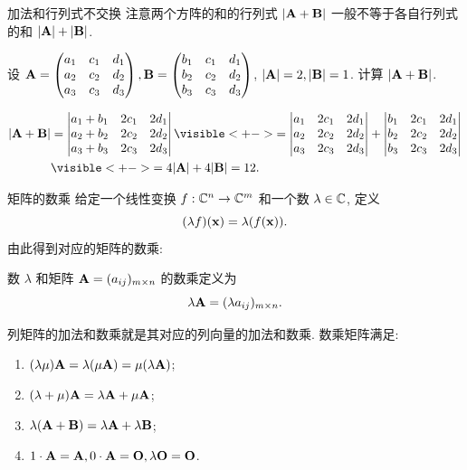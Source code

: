 \begin{frame}{加法和行列式不交换}
	\onslide<+->
	注意两个方阵的和的行列式 $|{\mathbf{A}}+{\mathbf{B}}|$ 一般\alert{不等于}各自行列式的和 $|{\mathbf{A}}|+|{\mathbf{B}}|$.
	\onslide<+->
	\begin{example}
		设 ${\mathbf{A}}=\begin{pmatrix}
			a_1&c_1&d_1\\
			a_2&c_2&d_2\\
			a_3&c_3&d_3
		\end{pmatrix},{\mathbf{B}}=\begin{pmatrix}
			b_1&c_1&d_1\\
			b_2&c_2&d_2\\
			b_3&c_3&d_3
		\end{pmatrix}$, $|{\mathbf{A}}|=2,|{\mathbf{B}}|=1$.
		计算 $|{\mathbf{A}}+{\mathbf{B}}|$.
	\end{example}
	\onslide<+->
	\begin{solution}
		\begin{align*}
			|\bfA+\bfB|&=\detm{
				a_1+b_1&2c_1&2d_1\\
				a_2+b_2&2c_2&2d_2\\
				a_3+b_3&2c_3&2d_3
			}
			\visible<+->{=\detm{
				a_1&2c_1&2d_1\\
				a_2&2c_2&2d_2\\
				a_3&2c_3&2d_3
			}+\detm{
				b_1&2c_1&2d_1\\
				b_2&2c_2&2d_2\\
				b_3&2c_3&2d_3
			}}\\
			&\visible<+->{=4|\bfA|+4|\bfB|=12.}
		\end{align*}
	\end{solution}
\end{frame}


\begin{frame}{矩阵的数乘}
	\onslide<+->
	给定一个线性变换 $f:{\mathbb{C}}^n\rightarrow{\mathbb{C}}^m$ 和一个数 $\lambda\in{\mathbb{C}}$, 定义
	\[(\lambda f)({\mathbf{x}})=\lambda(f({\mathbf{x}})).\]
	\onslide<+->
	由此得到对应的矩阵的数乘:
	\onslide<+->
	\begin{definition}
		数 $\lambda$ 和矩阵 ${\mathbf{A}}=(a_{ij})_{m\times n}$ 的数乘定义为
		\[\lambda{\mathbf{A}}=(\lambda a_{ij})_{m\times n}.\]
	\end{definition}
	\onslide<+->
	列矩阵的加法和数乘就是其对应的列向量的加法和数乘.
	\onslide<+->
	数乘矩阵满足:
	\begin{enumerate}
		\item $(\lambda \mu){\mathbf{A}}=\lambda(\mu{\mathbf{A}})=\mu(\lambda{\mathbf{A}})$;
		\item $(\lambda+\mu){\mathbf{A}}=\lambda{\mathbf{A}}+\mu{\mathbf{A}}$;
		\item $\lambda({\mathbf{A}}+{\mathbf{B}})=\lambda{\mathbf{A}}+\lambda{\mathbf{B}}$;
		\item $1\cdot {\mathbf{A}}={\mathbf{A}}, 0\cdot{\mathbf{A}}={\mathbf{O}},\lambda{\mathbf{O}}={\mathbf{O}}$.
	\end{enumerate}
\end{frame}


